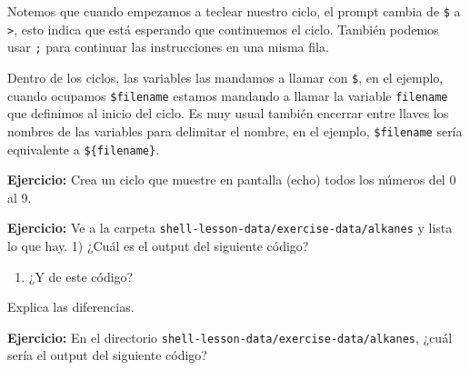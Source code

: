 \documentclass[
]{book}
\newenvironment{Shaded}{\begin{snugshade}}{\end{snugshade}}
\newcommand{\ExtensionTok}[1]{#1}
\newcommand{\NormalTok}[1]{#1}
\newcommand{\OperatorTok}[1]{\textcolor[rgb]{0.81,0.36,0.00}{\textbf{#1}}}
\newcommand{\PreprocessorTok}[1]{\textcolor[rgb]{0.56,0.35,0.01}{\textit{#1}}}
\newcommand{\VariableTok}[1]{\textcolor[rgb]{0.00,0.00,0.00}{#1}}
\providecommand{\tightlist}{%
  \setlength{\itemsep}{0pt}\setlength{\parskip}{0pt}}
\begin{document}
Notemos que cuando empezamos a teclear nuestro ciclo, el prompt cambia de \texttt{\$} a \texttt{\textgreater{}}, esto indica que está esperando que continuemos el ciclo. También podemos usar \texttt{;} para continuar las instrucciones en una misma fila.

Dentro de los ciclos, las variables las mandamos a llamar con \texttt{\$}, en el ejemplo, cuando ocupamos \texttt{\$filename} estamos mandando a llamar la variable \texttt{filename} que definimos al inicio del ciclo. Es muy usual también encerrar entre llaves los nombres de las variables para delimitar el nombre, en el ejemplo, \texttt{\$filename} sería equivalente a \texttt{\$\{filename\}}.

\textbf{Ejercicio:} Crea un ciclo que muestre en pantalla (echo) todos los números del 0 al 9.

\textbf{Ejercicio:} Ve a la carpeta \texttt{shell-lesson-data/exercise-data/alkanes} y lista lo que hay.
1) ¿Cuál es el output del siguiente código?

\begin{Shaded}
\end{Shaded}

\begin{enumerate}
\def\labelenumi{\arabic{enumi})}
\setcounter{enumi}{1}
\tightlist
\item
  ¿Y de este código?
\end{enumerate}

\begin{Shaded}
\end{Shaded}

Explica las diferencias.

\textbf{Ejercicio:} En el directorio \texttt{shell-lesson-data/exercise-data/alkanes}, ¿cuál sería el output del siguiente código?
\end{document}
